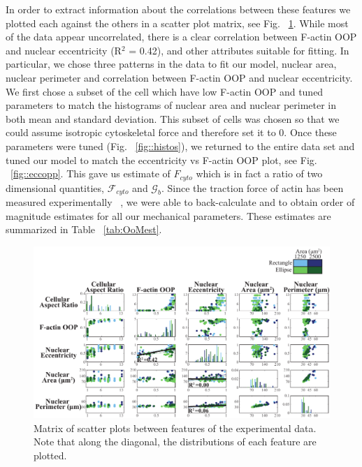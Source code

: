 In order to extract information about the correlations between these features we plotted each against the others in a scatter plot matrix, see Fig. ~\ref{fig::scattermatrix}. While most of the data appear uncorrelated, there is a clear correlation between F-actin OOP and nuclear eccentricity (R$^2$ = 0.42), and other attributes suitable for fitting. In particular, we chose three patterns in the data to fit our model, nuclear area, nuclear perimeter and correlation between F-actin OOP and nuclear eccentricity. We first chose a subset of the cell which have low F-actin OOP and tuned parameters to match the histograms of nuclear area and nuclear perimeter in both mean and standard deviation. This subset of cells was chosen so that we could assume isotropic cytoskeletal force and therefore set it to 0. Once these parameters were tuned (Fig. ~\ref{fig::histos}), we returned to the entire data set and tuned our model to match the eccentricity vs F-actin OOP plot, see Fig. ~\ref{fig::eccopp}. This gave us estimate of $F_{cyto}$ which is in fact a ratio of two dimensional quantities, $\mathcal{F}_{cyto}$ and  $\mathcal{G}_b$. Since the traction force of actin has been measured experimentally ~\cite{Kuo2012}, we were able to back-calculate and to obtain order of magnitude estimates for all our mechanical parameters. These estimates are summarized in Table ~\ref{tab:OoMest}.

\begin{figure}[h]
\centering
\captionsetup{width=.9\linewidth}
\includegraphics[width=.9\linewidth]{Project3/figs/Nancy_data.pdf}
\caption{Matrix of scatter plots between features of the experimental data. Note that along the diagonal, the distributions of each feature are plotted. }
\label{fig::scattermatrix}
\end{figure}


